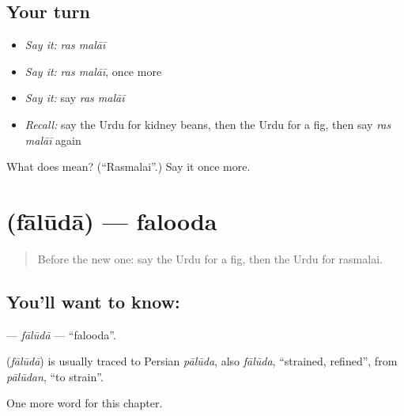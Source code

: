 \subsection*{Your turn}
\begin{itemize}
\raggedright
  \item \emph{Say it:} \emph{ras malāī}
  \item \emph{Say it:} \emph{ras malāī}, once more
  \item \emph{Say it:} say \emph{ras malāī}
  \item \emph{Recall:} say the Urdu for kidney beans, then the Urdu for a fig, then say \emph{ras malāī} again
\end{itemize}

\begin{tcolorbox}[breakable,colback=teal!4,colframe=teal!35!black,title={Before you move on}]
What does   mean? (\textquotedblleft{}Rasmalai\textquotedblright{}.) Say it once more.
\end{tcolorbox}
\section[\texorpdfstring{\ur{فالودہ} (fālūdā)}{فالودہ (fālūdā)}]{ (fālūdā) — falooda}

\label{lesson:UR-C175-faluda}



\begin{quote}
Before the new one: say the Urdu for a fig, then the Urdu for rasmalai.
\end{quote}

\subsection*{You'll want to know: }
\textbf{} — \emph{fālūdā} — \textquotedblleft{}falooda\textquotedblright{}.

\begin{cousinweb}
\textbf{} (\emph{fālūdā}) is usually traced to Persian \emph{pālūda}, also \emph{fālūda}, \textquotedblleft{}strained, refined\textquotedblright{}, from \emph{pālūdan}, \textquotedblleft{}to strain\textquotedblright{}.
\end{cousinweb}

\begin{grammarlens}[title={What you've built}]
One more word for this chapter.
\end{grammarlens}

